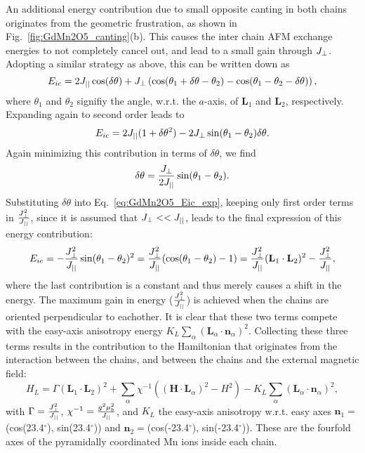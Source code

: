 An additional energy contribution due to small opposite canting in both chains originates from the geometric frustration, as shown in Fig.~\ref{fig:GdMn2O5_canting}(b). This causes the inter chain AFM exchange energies to not completely cancel out, and lead to a small gain through $J_{\perp}$.
Adopting a similar strategy as above, this can be written down as
\begin{equation}
	E_{ic} = 2 J_{||} \cos(\delta \theta) + J_{\perp} \left(\cos(\theta_1 + \delta \theta - \theta_2) - \cos(\theta_1 - \theta_2 -\delta \theta)\right),
\end{equation}
where $\theta_1$ and $\theta_2$ signifiy the angle, w.r.t. the $a$-axis, of $\mathbf{L}_1$ and $\mathbf{L}_2$, respectively.
Expanding again to second order leads to
\begin{equation}
	E_{ic} = 2 J_{||} ( 1+ \delta \theta^2) - 2 J_{\perp} \sin(\theta_1 - \theta_2)\delta \theta. \label{eq:GdMn2O5_Eic_exp}
\end{equation}
Again minimizing this contribution in terms of $\delta \theta$, we find
\begin{equation}
	\delta \theta = \frac{J_{\perp}}{2 J_{||}} \sin(\theta_1 - \theta_2).
\end{equation}
Substituting $\delta \theta$ into Eq.~\ref{eq:GdMn2O5_Eic_exp}, keeping only first order terms in $\frac{J_{\perp}^2}{J_{||}}$, since it is assumed that $J_{\perp} << J_{||}$, leads to the final expression of this energy contribution:
\begin{equation}
	E_{ic} = -\frac{J_{\perp}^2}{J_{||}}\sin(\theta_1 - \theta_2)^2 =  \frac{J_{\perp}^2}{J_{||}}(\cos(\theta_1 - \theta_2) - 1) = \frac{J_{\perp}^2}{J_{||}}(\mathbf{L}_1 \cdot \mathbf{L}_2)^2 - \frac{J_{\perp}^2}{J_{||}},
\end{equation}
where the last contribution is a constant and thus merely causes a shift in the energy.
The maximum gain in energy ($\frac{J_{\perp}^2}{J_{||}}$) is achieved when the chains are oriented perpendicular to eachother.
It is clear that these two terms compete with the easy-axis anisotropy energy $K_L\sum_\alpha(\mathbf{L}_\alpha\cdot \mathbf{n}_\alpha)^2$.
Collecting these three terms results in the contribution to the Hamiltonian that originates from the interaction between the chains, and between the chains and the external magnetic field:
\begin{equation}
	H_L = \Gamma(\mathbf{L}_1\cdot \mathbf{L}_2)^2
    +\sum_{\alpha}\chi^{-1}((\mathbf{H}\cdot \mathbf{L}_\alpha)^2-H^2)
    -K_L\sum_\alpha(\mathbf{L}_\alpha\cdot \mathbf{n}_\alpha)^2\label{eq:GdMn2O5_hami_1},
\end{equation}
with $\Gamma = \frac{J_{\perp}^2}{J_{||}}$, $\chi^{-1} = \frac{g^2\mu_b^2}{J_{||}}$, and $K_L$ the easy-axis anisotropy w.r.t. easy axes $\mathbf{n}_1=$(cos(23.4$^\circ$), sin(23.4$^\circ$)) and $\mathbf{n}_2=$(cos(-23.4$^\circ$), sin(-23.4$^\circ$)). These are the fourfold axes of the pyramidally coordinated Mn ions inside each chain.

